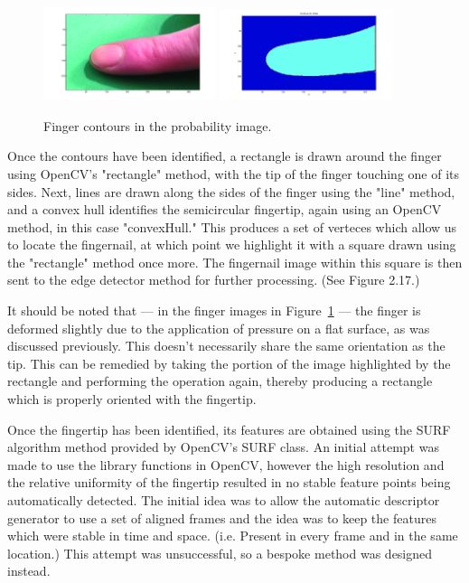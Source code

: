 \begin{figure}[h!]
  \centering
      \includegraphics[width=0.45\textwidth]{Chapter4/Figs/imgJIndex1.jpg}
    \includegraphics[width=0.45\textwidth]{Chapter4/Figs/indexContours.jpg}
    \caption{Finger contours in the probability image.}\label{fig:IndexContours}
\end{figure}

Once the contours have been identified, a rectangle is drawn around the finger using OpenCV's "rectangle" method, with the tip of the finger touching one of its sides. Next, lines are drawn along the sides of the finger using the "line" method, and a convex hull identifies the semicircular fingertip, again using an OpenCV method, in this case "convexHull." This produces a set of verteces which allow us to locate the fingernail, at which point we highlight it with a square drawn using the "rectangle" method once more. The fingernail image within this square is then sent to the edge detector method for further processing. (See Figure 2.17.)

It should be noted that --- in the finger images in Figure~\ref{fig:IndexContours} --- the finger is deformed slightly due to the application of pressure on a flat surface, as was discussed previously. This doesn't necessarily share the same orientation as the tip. This can be remedied by taking the portion of the image highlighted by the rectangle and performing the operation again, thereby producing a rectangle which is properly oriented with the fingertip.

Once the fingertip has been identified, its features are obtained using the SURF algorithm method provided by OpenCV's SURF class. An initial attempt was made to use the library functions in OpenCV, however the high resolution and the relative uniformity of the fingertip resulted in no stable feature points being automatically detected. The initial idea was to allow the automatic descriptor generator to use a set of aligned frames and the idea was to keep the features which were stable in time and space. (i.e. Present in every frame and in the same location.) This attempt was unsuccessful, so a bespoke method was designed instead.

